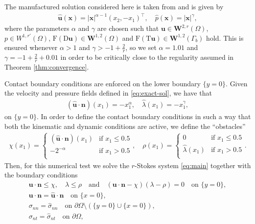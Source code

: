 \documentclass[onefignum,onetabnum]{siamart190516}
\newcommand{\bn}{\boldsymbol{n}}
\newcommand{\bu}{\boldsymbol{u}}
\newcommand{\bx}{\boldsymbol{x}}
\newcommand{\bW}{\boldsymbol{W}}
\newcommand{\bT}{\boldsymbol{\mathrm{T}}}
\newcommand{\bD}{\boldsymbol{\mathrm{D}}}
\newcommand{\bF}{\boldsymbol{\mathrm{F}}}
\begin{document}
The manufactured solution considered here is taken from \cite{belenki2012} and is given by
%
\begin{align}\label{eq:exact-sol}
	\hat{\bu}(\bx) = |\bx|^{\alpha - 1} (x_2, -x_1)^\top, \quad \hat{p}(\bx) = |\bx|^\gamma,
\end{align}
%
where the parameters $\alpha$ and $\gamma$ are chosen such that $\bu\in \bW^{2,r}(\Omega)$, $p\in W^{1,r'}(\Omega)$, $\bF(\bD\bu)\in \bW^{1,2}(\Omega)$ and $\bF(\bT\bu)\in \bW^{1,2}(\Gamma_b)$ hold. This is ensured whenever $\alpha > 1$ and $\gamma > -1 + \frac{2}{r}$, so we set $\alpha = 1.01$ and $\gamma = -1 + \frac{2}{r} + 0.01$ in order to be critically close to the regularity assumed in Theorem \ref{thm:convergence}.

Contact boundary conditions are enforced on the lower boundary $\{ y = 0\}$. Given the velocity and pressure fields defined in \eqref{eq:exact-sol}, we have that
%
\begin{align*}
	(\hat{\bu}\cdot\bn)(x_1) = - x_1^{\alpha}, \quad \hat{\lambda}(x_1) = -x_1^\gamma,
\end{align*}
%
on $\{ y = 0\}$. In order to define the contact boundary conditions in such a way that both the kinematic and dynamic conditions are active, we define the ``obstacles''
%
\begin{align*}
	\chi(x_1) = \begin{cases}
		(\hat{\bu}\cdot\bn)(x_1) & \text{if $x_1 \leq 0.5$} \\
		-2^{-\alpha} & \text{if $x_1 > 0.5$} \\
	\end{cases},
	\quad
	\rho(x_1) = \begin{cases}
		0 & \text{if $x_1 \leq 0.5$} \\
		\hat{\lambda}(x_1) & \text{if $x_1 > 0.5$} \\
	\end{cases}.
\end{align*}
%
Then, for this numerical test we solve the $r$-Stokes system \eqref{eq:main} together with the boundary conditions
%
\begin{subequations}\label{eq:bc-exact}
\begin{align}
	\bu\cdot\bn \leq \chi, \quad \lambda \leq \rho \quad \text{and} \quad (\bu\cdot\bn - \chi)(\lambda - \rho) = 0 \quad  \text{on $\{y = 0\}$}, \\
	\bu\cdot\bn = \hat{\bu}\cdot\bn \quad \text{on $\{x = 0\}$}, \label{eq:bc-exact-un}\\
	\sigma_{nn} = \hat{\sigma}_{nn} \quad \text{on $\partial\Omega \setminus (\{y = 0\}\cup \{x=0\})$},\\
	\sigma_{nt} = \hat{\sigma}_{nt} \quad \text{on $\partial\Omega$},
\end{align}
\end{subequations}
\end{document}
